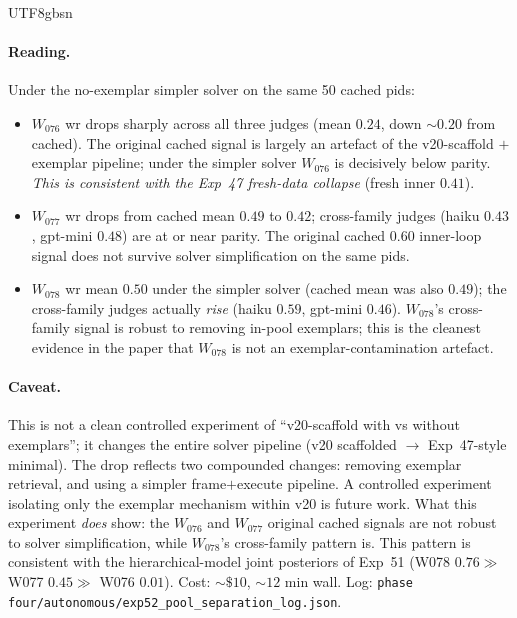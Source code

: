 \documentclass{article}
\begin{document}
\begin{CJK*}{UTF8}{gbsn}
\paragraph{Reading.} Under the no-exemplar simpler solver on the
same 50 cached pids:
\begin{itemize}[leftmargin=*,topsep=2pt,itemsep=2pt]
  \item \(W_{076}\) wr drops sharply across all three judges
    (mean \(0.24\), down \(\sim 0.20\) from cached). The original
    cached signal is largely an artefact of the v20-scaffold
    \(+\)exemplar pipeline; under the simpler solver \(W_{076}\)
    is decisively below parity. \emph{This is consistent with the
    Exp~47 fresh-data collapse} (fresh inner \(0.41\)).
  \item \(W_{077}\) wr drops from cached mean \(0.49\) to
    \(0.42\); cross-family judges (haiku \(0.43\), gpt-mini
    \(0.48\)) are at or near parity. The original cached
    \(0.60\) inner-loop signal does not survive solver
    simplification on the same pids.
  \item \(W_{078}\) wr mean \(0.50\) under the simpler solver
    (cached mean was also \(0.49\)); the cross-family judges
    actually \emph{rise} (haiku \(0.59\), gpt-mini \(0.46\)).
    \(W_{078}\)'s cross-family signal is robust to removing
    in-pool exemplars; this is the cleanest evidence in the paper
    that \(W_{078}\) is not an exemplar-contamination artefact.
\end{itemize}

\paragraph{Caveat.} This is not a clean controlled experiment of
``v20-scaffold with vs without exemplars''; it changes the entire
solver pipeline (v20 scaffolded \(\to\) Exp~47-style minimal).
The drop reflects two compounded changes: removing exemplar
retrieval, and using a simpler frame\(+\)execute pipeline. A
controlled experiment isolating only the exemplar mechanism
within v20 is future work. What this experiment \emph{does}
show: the \(W_{076}\) and \(W_{077}\) original cached signals are
not robust to solver simplification, while \(W_{078}\)'s
cross-family pattern is. This pattern is consistent with the
hierarchical-model joint posteriors of Exp~51
(W078 \(0.76 \gg\) W077 \(0.45 \gg\) W076 \(0.01\)). Cost:
\(\sim\$10\), \(\sim 12\) min wall. Log:
\texttt{phase four/autonomous/exp52\_pool\_separation\_log.json}.


\end{CJK*}
\end{document}
